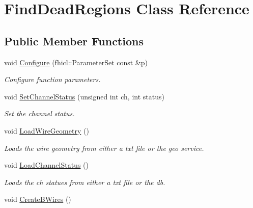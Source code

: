 \hypertarget{classFindDeadRegions}{\section{Find\-Dead\-Regions Class Reference}
\label{classFindDeadRegions}
}
\subsection*{Public Member Functions}
\begin{DoxyCompactItemize}
\item 
\hypertarget{classFindDeadRegions_a94b207b673c58df861537ead4ec5385a}{void \hyperlink{classFindDeadRegions_a94b207b673c58df861537ead4ec5385a}{Configure} (fhicl\-::\-Parameter\-Set const \&p)}\label{classFindDeadRegions_a94b207b673c58df861537ead4ec5385a}

\begin{DoxyCompactList}\small\item\em Configure function parameters. \end{DoxyCompactList}\item 
\hypertarget{classFindDeadRegions_ac66a2e50bc8138b3f62284a319e1a60f}{void \hyperlink{classFindDeadRegions_ac66a2e50bc8138b3f62284a319e1a60f}{Set\-Channel\-Status} (unsigned int ch, int status)}\label{classFindDeadRegions_ac66a2e50bc8138b3f62284a319e1a60f}

\begin{DoxyCompactList}\small\item\em Set the channel status. \end{DoxyCompactList}\item 
\hypertarget{classFindDeadRegions_ab59b2e9e90a69a8bf06dfe7bc299b8ce}{void \hyperlink{classFindDeadRegions_ab59b2e9e90a69a8bf06dfe7bc299b8ce}{Load\-Wire\-Geometry} ()}\label{classFindDeadRegions_ab59b2e9e90a69a8bf06dfe7bc299b8ce}

\begin{DoxyCompactList}\small\item\em Loads the wire geometry from either a txt file or the geo service. \end{DoxyCompactList}\item 
\hypertarget{classFindDeadRegions_aa16f381183cdd02642e6ae38073dc732}{void \hyperlink{classFindDeadRegions_aa16f381183cdd02642e6ae38073dc732}{Load\-Channel\-Status} ()}\label{classFindDeadRegions_aa16f381183cdd02642e6ae38073dc732}

\begin{DoxyCompactList}\small\item\em Loads the ch statues from either a txt file or the db. \end{DoxyCompactList}\item 
\hypertarget{classFindDeadRegions_a5e1b035c74beb151bdd2a0315db336b1}{void \hyperlink{classFindDeadRegions_a5e1b035c74beb151bdd2a0315db336b1}{Create\-B\-Wires} ()}\label{classFindDeadRegions_a5e1b035c74beb151bdd2a0315db336b1}


\end{DoxyCompactItemize}
